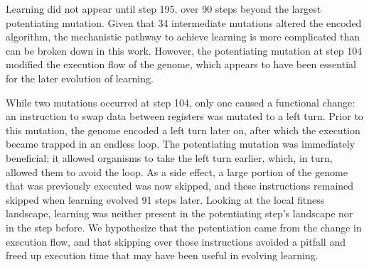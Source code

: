 Learning did not appear until step 195, over 90 steps beyond the largest potentiating mutation. 
Given that 34 intermediate mutations altered the encoded algorithm, the mechanistic pathway to achieve learning is more complicated than can be broken down in this work.
However, the potentiating mutation at step 104 modified the execution flow of the genome, which appears to have been essential for the later evolution of learning. %

While two mutations occurred at step 104, only one caused a functional change: an instruction to swap data between registers was mutated to a left turn. 
Prior to this mutation, the genome encoded a left turn later on, after which the execution became trapped in an endless loop. 
The potentiating mutation was immediately beneficial; it allowed organisms to take the left turn earlier, which, in turn, allowed them to avoid the loop. 
As a side effect, a large portion of the genome that was previously executed was now skipped, and these instructions remained skipped when learning evolved 91 steps later.
Looking at the local fitness landscape, learning was neither present in the potentiating step's landscape nor in the step before.
We hypothesize that the potentiation came from the change in execution flow, and that skipping over those instructions avoided a pitfall and freed up execution time that may have been useful in evolving learning.



